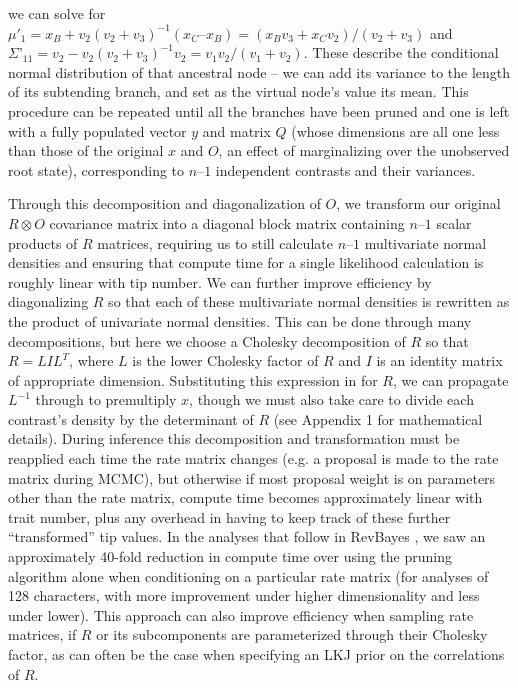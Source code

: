 \documentclass[10pt, twocolumn, twoside]{article}
\begin{document}
we can solve for $\mu'_1 = x_B + v_2(v_2 + v_3)^{-1}(x_C – x_B) = (x_Bv_3 + x_Cv_2) / (v_2 + v_3)$ and $\Sigma’_{11} = v_2 - v_2(v_2 + v_3)^{-1}v_2 = v_1v_2/(v_1 + v_2)$. These describe the conditional normal distribution of that ancestral node – we can add its variance to the length of its subtending branch, and set as the virtual node’s value its mean. This procedure can be repeated until all the branches have been pruned and one is left with a fully populated vector $y$ and matrix $Q$ (whose dimensions are all one less than those of the original $x$ and $O$, an effect of marginalizing over the unobserved root state), corresponding to $n – 1$ independent contrasts and their variances.

Through this decomposition and diagonalization of $O$, we transform our original $R \otimes O$ covariance matrix into a diagonal block matrix containing $n – 1$ scalar products of $R$ matrices, requiring us to still calculate $n – 1$ multivariate normal densities and ensuring that compute time for a single likelihood calculation is roughly linear with tip number. We can further improve efficiency by diagonalizing $R$ so that each of these multivariate normal densities is rewritten as the product of univariate normal densities. This can be done through many decompositions, but here we choose a Cholesky decomposition of $R$ so that $R = LIL^T$, where $L$ is the lower Cholesky factor of $R$ and $I$ is an identity matrix of appropriate dimension. Substituting this expression in for $R$, we can propagate $L^{-1}$ through to premultiply $x$, though we must also take care to divide each contrast’s density by the determinant of $R$ (see Appendix 1 for mathematical details). During inference this decomposition and transformation must be reapplied each time the rate matrix changes (e.g. a proposal is made to the rate matrix during MCMC), but otherwise if most proposal weight is on parameters other than the rate matrix, compute time becomes approximately linear with trait number, plus any overhead in having to keep track of these further “transformed” tip values. In the analyses that follow in RevBayes \citep{hohnaRevBayesBayesianPhylogenetic2016a}, we saw an approximately 40-fold reduction in compute time over using the pruning algorithm alone when conditioning on a particular rate matrix (for analyses of 128 characters, with more improvement under higher dimensionality and less under lower). This approach can also improve efficiency when sampling rate matrices, if $R$ or its subcomponents are parameterized through their Cholesky factor, as can often be the case when specifying an LKJ prior on the correlations of $R$.
\end{document}
